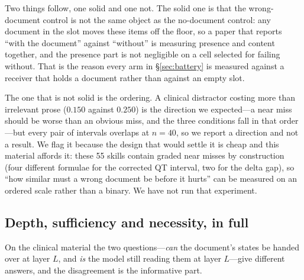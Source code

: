 \documentclass{article}
\begin{document}
Two things follow, one solid and one not. The solid one is that the
wrong-document control is not the same object as the no-document control: any
document in the slot moves these items off the floor, so a paper that reports
``with the document'' against ``without'' is measuring presence and content
together, and the presence part is not negligible on a cell selected for failing
without. That is the reason every arm in \S\ref{sec:battery} is measured against
a receiver that holds a document rather than against an empty slot.

The one that is not solid is the ordering. A clinical distractor costing more
than irrelevant prose ($0.150$ against $0.250$) is the direction we expected---a
near miss should be worse than an obvious miss, and the three conditions fall in
that order---but every pair of intervals overlaps at $n=40$, so we report a
direction and not a result. We flag it because the design that would settle it is cheap and
this material affords it: these 55 skills contain graded near misses by
construction (four different formulae for the corrected QT interval, two for the
delta gap), so ``how similar must a wrong document be before it hurts'' can be
measured on an ordered scale rather than a binary. We have not run that
experiment.




\subsection{Depth, sufficiency and necessity, in full}
\label{app:depth}

\begin{table}[h]
\caption{Participation ratio of the document's span on Qwen3-8B, measured four
ways, medians over $36$ items (the plain column is bimodal, so its mean
describes no item). The first column is the quantity usually reported and the
only one that collapses. The last two columns say why: at layer $16$ one token
in $34$ of $40$ documents acquires a state $150$ times (median) the span's norm, carried by
two fixed hidden dimensions, and the top eight dimensions then hold $98\%$ of
the variance. Removing four positions out of four hundred, or normalising each
position to unit length, removes the collapse entirely.}
\label{tab:prdiag}
\centering
\small
\setlength{\tabcolsep}{4pt}

\end{table}


On the clinical material the two questions---\emph{can} the document's states be
handed over at layer $L$, and \emph{is} the model still reading them at layer
$L$---give different answers, and the disagreement is the informative part.
\end{document}
